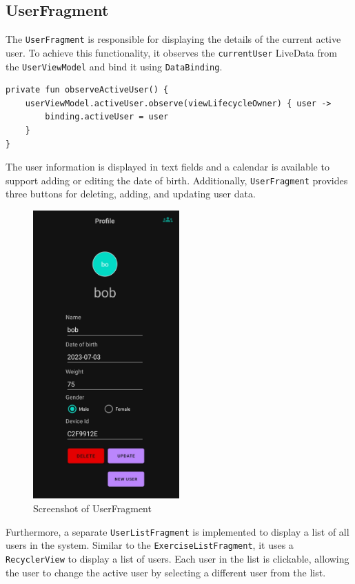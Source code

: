 \subsection{UserFragment}
The \texttt{UserFragment} is responsible for displaying the details of the current active user. 
To achieve this functionality, it observes the \texttt{currentUser} LiveData from the \texttt{UserViewModel} and bind it using \texttt{DataBinding}. 
\begin{lstlisting}[caption={Observer for currentUser (UserFragment)}]
private fun observeActiveUser() {
    userViewModel.activeUser.observe(viewLifecycleOwner) { user ->
        binding.activeUser = user
    }
}
\end{lstlisting}
The user information is displayed in text fields and a calendar is available to support adding or editing the date of birth. 
Additionally, \texttt{UserFragment} provides three buttons for deleting, adding, and updating user data.
\begin{figure}[H]
    \centering
    \includegraphics[width=0.5\textwidth]{images/userfragment-screenshot.jpeg}
    \caption{Screenshot of UserFragment}
    \label{fig:userfragment_screenshot}
\end{figure}

Furthermore, a separate \texttt{UserListFragment} is implemented to display a list of all users in the system. 
Similar to the \texttt{ExerciseListFragment}, it uses a \texttt{RecyclerView} to display a list of users. 
Each user in the list is clickable, allowing the user to change the active user by selecting a different user from the list.

